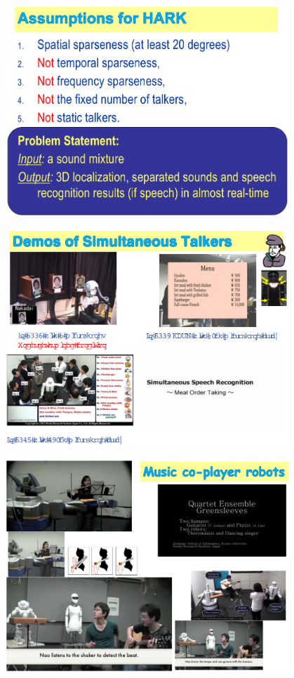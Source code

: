 \documentclass[xetex,mathserif,serif]{beamer}
\begin{document}
	\begin{frame}
		\begin{center}
			\includegraphics[width=0.8\textwidth]{okuno8.png}
		\end{center}
	\end{frame}

	\begin{frame}
		\begin{center}
			\includegraphics[width=0.8\textwidth]{okuno9.png}
		\end{center}
	\end{frame}

	\begin{frame}
		\begin{center}
			\includegraphics[width=0.8\textwidth]{okuno10.png}
		\end{center}
	\end{frame}
\end{document}
